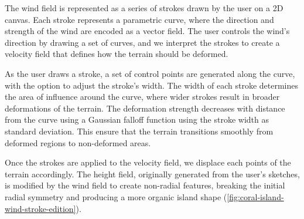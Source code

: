 The wind field is represented as a series of strokes drawn by the user on a 2D canvas. Each stroke represents a parametric curve, where the direction and strength of the wind are encoded as a vector field. The user controls the wind's direction by drawing a set of curves, and we interpret the strokes to create a velocity field that defines how the terrain should be deformed.

As the user draws a stroke, a set of control points are generated along the curve, with the option to adjust the stroke's width. The width of each stroke determines the area of influence around the curve, where wider strokes result in broader deformations of the terrain.
The deformation strength decreases with distance from the curve using a Gaussian falloff function using the stroke width as standard deviation. This ensure that the terrain transitions smoothly from deformed regions to non-deformed areas.

Once the strokes are applied to the velocity field, we displace each points of the terrain accordingly. The height field, originally generated from the user's sketches, is modified by the wind field to create non-radial features, breaking the initial radial symmetry and producing a more organic island shape (\cref{fig:coral-island-wind-stroke-edition}).


